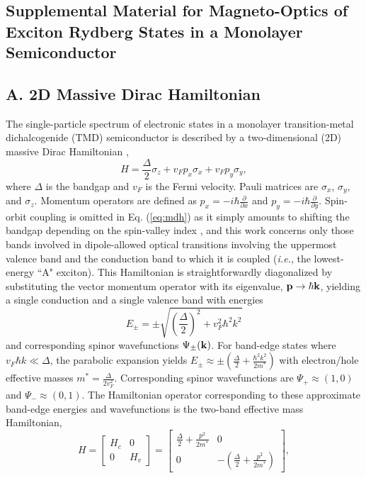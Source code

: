 \documentclass[aps,prl,twocolumn]{revtex4-1}
\begin{document}
\newpage
\onecolumngrid
\setcounter{figure}{0}
\setcounter{equation}{0}
\renewcommand{\thefigure}{S\arabic{figure}}
\subsection{Supplemental Material for Magneto-Optics of Exciton Rydberg States in a Monolayer Semiconductor}
\subsection{A. 2D Massive Dirac Hamiltonian}

The single-particle spectrum of electronic states in a monolayer transition-metal dichalcogenide (TMD) semiconductor is described by a two-dimensional (2D) massive Dirac Hamiltonian \cite{Xiao, Rose},
%
\begin{equation}
H=\frac{\Delta}{2}\sigma_z+v_F p_x\sigma_x+v_F p_y\sigma_y,\label{eq:mdh}
\end{equation}
%
where $\Delta$ is the bandgap and $v_F$ is the Fermi velocity. Pauli matrices are $\sigma_x$, $\sigma_y$, and $\sigma_z$. Momentum operators are defined as $p_{x}=-i\hbar\frac{\partial}{\partial x}$ and $p_{y}=-i\hbar\frac{\partial}{\partial y}$. Spin-orbit coupling is omitted in Eq. (\ref{eq:mdh}) as it simply amounts to shifting the bandgap depending on the spin-valley index \cite{Xiao}, and this work concerns only those bands involved in dipole-allowed optical transitions involving the uppermost valence band and the conduction band to which it is coupled (\textit{i.e.}, the lowest-energy ``A" exciton). This Hamiltonian is straightforwardly diagonalized by substituting the vector momentum operator with its eigenvalue, ${\bf p}\rightarrow\hbar{\bf k}$,  yielding a single conduction and a single valence band with energies
%
\begin{equation}
E_\pm=\pm \sqrt{\left(\frac{\Delta}{2}\right)^2+v_F^2 \hbar^2k^2} 
\end{equation}
%
and corresponding spinor wavefunctions $\Psi_\pm(\bf{k})$. For band-edge states where $v_F \hbar k\ll\Delta$, the parabolic expansion yields $E_\pm\approx\pm\left(\frac{\Delta}{2}+\frac{\hbar^2 k^2}{2m^*}\right)$ with electron/hole effective masses $m^*=\frac{\Delta}{2v_F^2}$. Corresponding spinor wavefunctions are $\Psi_+\approx (1,0)$ and $\Psi_-\approx(0,1)$. The Hamiltonian operator corresponding to these approximate band-edge energies and wavefunctions is the two-band effective mass Hamiltonian,
%
\begin{equation}
H=\begin{bmatrix}H_{c} & 0\\
0 & H_{v}
\end{bmatrix}=\begin{bmatrix}\frac{\Delta}{2}+\frac{p^{2}}{2m^{*}} & 0\\
0 & -\left(\frac{\Delta}{2}+\frac{p^{2}}{2m^{*}}\right)
\end{bmatrix},
\end{equation}
\end{document}
